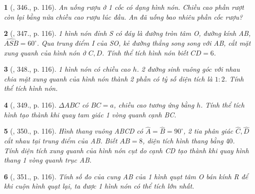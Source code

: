 \documentclass{article}
\newtheorem{baitoan}{}
\begin{document}
\begin{baitoan}[\cite{Binh_Toan_9_tap_2}, 346., p. 116]
	An uống rượu ở 1 cốc có dạng hình nón. Chiều cao phần rượt còn lại bằng nửa chiều cao rượu lúc đầu. An đã uống bao nhiêu phần cốc rượu?
\end{baitoan}

\begin{baitoan}[\cite{Binh_Toan_9_tap_2}, 347., p. 116]
	1 hình nón đỉnh S có đáy là đường tròn tâm O, đường kính AB, $\widehat{ASB} = 60^\circ$. Qua trung điểm I của SO, kẻ đường thẳng song song với AB, cắt mặt xung quanh của hình nón ở $C,D$. Tính thể tích hình nón biết $CD = 6$.
\end{baitoan}

\begin{baitoan}[\cite{Binh_Toan_9_tap_2}, 348., p. 116]
	1 hình nón có chiều cao $h$. 2 đường sinh vuông góc với nhau chia mặt xung quanh của hình nón thành 2 phần có tỷ số diện tích là $1:2$. Tính thể tích hình nón.
\end{baitoan}

\begin{baitoan}[\cite{Binh_Toan_9_tap_2}, 349., p. 116]
	$\Delta ABC$ có $BC = a$, chiều cao tương ứng bằng $h$. Tính thể tích hình tạo thành khi quay tam giác 1 vòng quanh cạnh BC.
\end{baitoan}

\begin{baitoan}[\cite{Binh_Toan_9_tap_2}, 350., p. 116]
	Hình thang vuông ABCD có $\widehat{A} = \widehat{B} = 90^\circ$, 2 tia phân giác $\widehat{C},\widehat{D}$ cắt nhau tại trung điểm của AB. Biết $AB = 8$, diện tích hình thang bằng $40$. Tính diện tích xung quanh của hình nón cụt do cạnh CD tạo thành khi quay hình thang 1 vòng quanh trục AB.
\end{baitoan}

\begin{baitoan}[\cite{Binh_Toan_9_tap_2}, 351., p. 116]
	Tính số đo của cung AB của 1 hình quạt tâm O bán kính R để khi cuộn hình quạt lại, ta được 1 hình nón có thể tích lớn nhất.
\end{baitoan}

\end{document}
